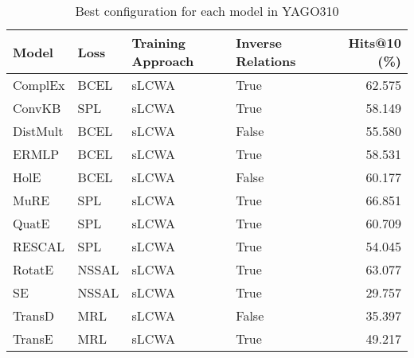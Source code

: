 \begin{table}
\centering
\caption{Best configuration for each model in YAGO310}
\label{best_models_yago310}
\begin{tabular}{llllr}
\toprule
   Model &  Loss & Training Approach & Inverse Relations &  Hits@10 (\%) \\
\midrule
 ComplEx &  BCEL &             sLCWA &              True &       62.575 \\
  ConvKB &   SPL &             sLCWA &              True &       58.149 \\
DistMult &  BCEL &             sLCWA &             False &       55.580 \\
   ERMLP &  BCEL &             sLCWA &              True &       58.531 \\
    HolE &  BCEL &             sLCWA &             False &       60.177 \\
    MuRE &   SPL &             sLCWA &              True &       66.851 \\
   QuatE &   SPL &             sLCWA &              True &       60.709 \\
  RESCAL &   SPL &             sLCWA &              True &       54.045 \\
  RotatE & NSSAL &             sLCWA &              True &       63.077 \\
      SE & NSSAL &             sLCWA &              True &       29.757 \\
  TransD &   MRL &             sLCWA &             False &       35.397 \\
  TransE &   MRL &             sLCWA &              True &       49.217 \\
\bottomrule
\end{tabular}
\end{table}

